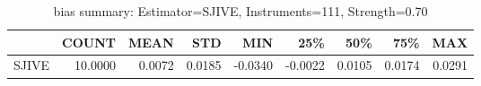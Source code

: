 \begin{table}[ht]
\centering
\caption{bias summary: Estimator=SJIVE, Instruments=111, Strength=0.70}
\begin{tabular}{lrrrrrrrr}
\toprule
 & COUNT & MEAN & STD & MIN & 25\% & 50\% & 75\% & MAX \\
\midrule
SJIVE & 10.0000 & 0.0072 & 0.0185 & -0.0340 & -0.0022 & 0.0105 & 0.0174 & 0.0291 \\
\bottomrule
\end{tabular}
\end{table}
